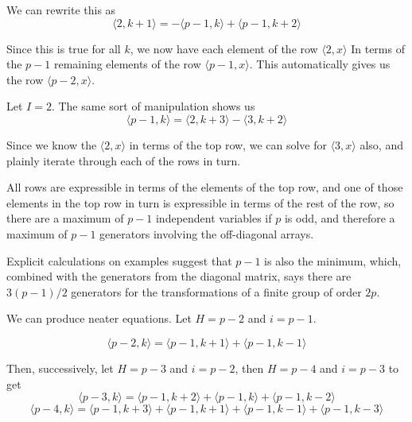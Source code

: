 \documentclass{revtex4-1}
\begin{document}
We can rewrite this as
\begin{equation}
\langle 2, k+1 \rangle = - \langle p-1, k \rangle + \langle p-1, k+2 \rangle
\end{equation}

Since this is true for all $k$, we now have each element of the row $\langle 2,x \rangle$
In terms of the $p-1$ remaining elements of the row $\langle p-1, x \rangle$.  This
automatically gives us the row $\langle p-2, x \rangle$.

\par Let $I=2$.  The same sort of manipulation shows us
\begin{equation}
\langle p-1, k \rangle = \langle 2, k+3 \rangle - \langle 3, k+2 \rangle
\end{equation}

Since we know the $\langle 2, x \rangle$ in terms of the top row, we can solve
for $\langle 3, x \rangle$ also, and plainly iterate through each of the rows in turn.

\par All rows are expressible in terms of the elements of the top row, and one of 
those elements in the top row in turn is expressible in terms of the rest of the row, so there are a maximum
of $p-1$ independent variables if $p$ is odd, and therefore a maximum of $p-1$ generators
involving the off-diagonal arrays.

\par Explicit calculations on examples suggest that $p-1$ is also the minimum, which,
combined with the generators from the diagonal matrix, says there are $3 (p-1)/2$ 
generators for the transformations of a finite group of order $2p$.

\par We can produce neater equations.  Let $H=p-2$ and $i=p-1$.

\begin{equation}
\langle p-2, k \rangle = \langle p-1, k+1 \rangle + \langle p-1, k-1 \rangle
\end{equation}

Then, successively, let $H=p-3$ and $i=p-2$, then $H=p-4$ and $i=p-3$ to get
\begin{equation}
\langle p-3, k \rangle = \langle p-1, k+2 \rangle + \langle p-1, k \rangle + \langle p-1, k-2 \rangle
\end{equation}
\begin{equation}
\langle p-4, k \rangle = \langle p-1, k+3 \rangle + \langle p-1, k+1 \rangle +
\langle p-1, k-1 \rangle + \langle p-1, k-3 \rangle
\end{equation}
\end{document}
